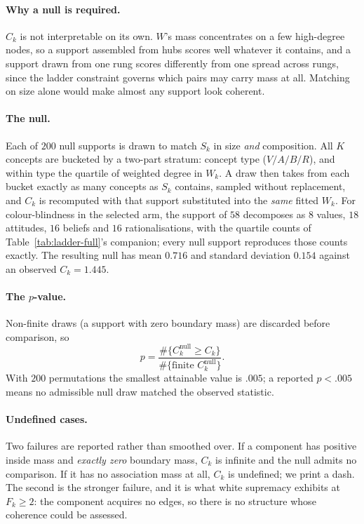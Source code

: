 \paragraph{Why a null is required.} $C_k$ is not interpretable on its own. $W$'s mass
concentrates on a few high-degree nodes, so a support assembled from hubs scores well
whatever it contains, and a support drawn from one rung scores differently from one
spread across rungs, since the ladder constraint governs which pairs may carry mass at
all. Matching on size alone would make almost any support look coherent.

\paragraph{The null.} Each of $200$ null supports is drawn to match $S_k$ in size
\emph{and} composition. All $K$ concepts are bucketed by a two-part stratum: concept type
($V/A/B/R$), and within type the quartile of weighted degree in $W_k$. A draw then takes
from each bucket exactly as many concepts as $S_k$ contains, sampled without replacement,
and $C_k$ is recomputed with that support substituted into the \emph{same} fitted $W_k$.
For colour-blindness in the selected arm, the support of $58$ decomposes as $8$ values,
$18$ attitudes, $16$ beliefs and $16$ rationalisations, with the quartile counts of
Table~\ref{tab:ladder-full}'s companion; every null support reproduces those counts
exactly. The resulting null has mean $0.716$ and standard deviation $0.154$ against an
observed $C_k=1.445$.

\paragraph{The $p$-value.} Non-finite draws (a support with zero boundary mass) are
discarded before comparison, so
\[
  p=\frac{\#\{C_k^{\text{null}}\ge C_k\}}{\#\{\text{finite }C_k^{\text{null}}\}} .
\]
With $200$ permutations the smallest attainable value is $.005$; a reported $p<.005$
means no admissible null draw matched the observed statistic.

\paragraph{Undefined cases.} Two failures are reported rather than smoothed over. If a
component has positive inside mass and \emph{exactly zero} boundary mass, $C_k$ is
infinite and the null admits no comparison. If it has no association mass at all,
$C_k$ is undefined; we print a dash. The second is the stronger failure, and it is what
white supremacy exhibits at $F_k\ge2$: the component acquires no edges, so there is no
structure whose coherence could be assessed.

